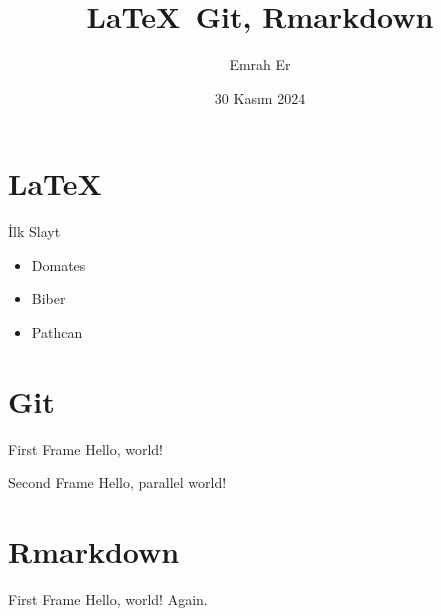 \documentclass{beamer}
\title{\LaTeX{}\, Git, Rmarkdown}
\date{30 Kasım 2024}
\author{Emrah Er}
\institute{AÜSBF}
\begin{document}
  \maketitle

\section{\LaTeX{}}
  \begin{frame}{İlk Slayt}
    \begin{itemize}
      \item Domates
      \item Biber
      \item Patlıcan
    \end{itemize}
  \end{frame}

\section{Git}
  \begin{frame}{First Frame}
    Hello, world!
  \end{frame}
  \begin{frame}{Second Frame}
    Hello, parallel world!
  \end{frame}
\section{Rmarkdown}
  \begin{frame}{First Frame}
    Hello, world! Again.
  \end{frame}
\end{document}
